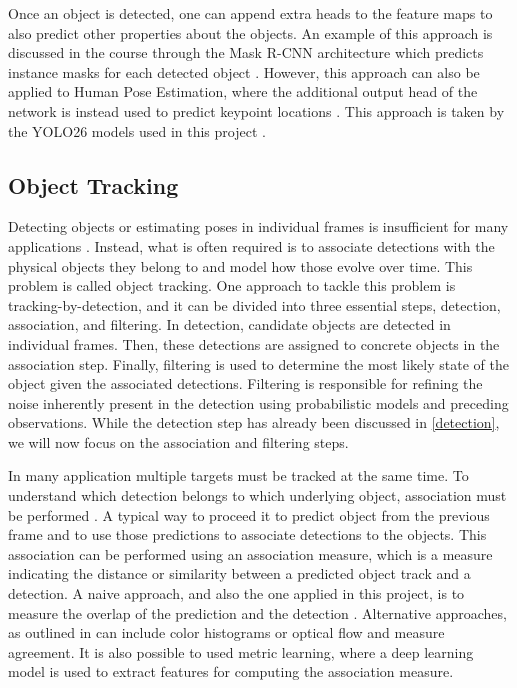 Once an object is detected, one can append extra heads to the feature maps to also predict other properties about the objects. An example of this approach is discussed in the course through the Mask R-CNN architecture \parencite{he2017mask} which predicts instance masks for each detected object \parencite[p. 128]{Lanz2026Notes}. However, this approach can also be applied to Human Pose Estimation, where the additional output head of the network is instead used to predict keypoint locations \parencite{maji2022yolo}. This approach is taken by the YOLO26 models used in this project \parencite{ultralyticsYOLO,sapkota2025yolo26,sapkota2025ultralytics}.


\subsection{Object Tracking} \label{tracking}

Detecting objects or estimating poses in individual frames is insufficient for many applications \parencite[p. 129]{Lanz2026Notes}. Instead, what is often required is to associate detections with the physical objects they belong to and model how those evolve over time. This problem is called object tracking. One approach to tackle this problem is tracking-by-detection, and it can be divided into three essential steps, detection, association, and filtering. In detection, candidate objects are detected in individual frames. Then, these detections are assigned to concrete objects in the association step. Finally, filtering is used to determine the most likely state of the object given the associated detections. Filtering is responsible for refining the noise inherently present in the detection using probabilistic models and preceding observations. While the detection step has already been discussed in \cref{detection}, we will now focus on the association and filtering steps.

In many application multiple targets must be tracked at the same time. To understand which detection belongs to which underlying object, association must be performed \parencite[p. 134-135]{Lanz2026Notes}. A typical way to proceed it to predict object from the previous frame and to use those predictions to associate detections to the objects. This association can be performed using an association measure, which is a measure indicating the distance or similarity between a predicted object track and a detection. A naive approach, and also the one applied in this project, is to measure the overlap of the prediction and the detection \parencite{bewley2016simple}. Alternative approaches, as outlined in \parencite[p. 135-136]{Lanz2026Notes} can include color histograms or optical flow and measure agreement. It is also possible to used metric learning, where a deep learning model is used to extract features for computing the association measure.

